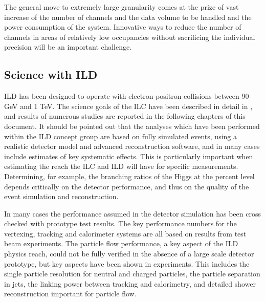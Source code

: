 The general move to extremely large granularity comes at the prize of vast increase of the number of channels and the data volume to be handled and the power consumption of the system. Innovative ways to reduce the number of channels in areas of relatively low occupancies without sacrificing the individual precision will be an important challenge.


\subsection{Science with ILD}
ILD has been designed to operate with electron-positron collisions between 90 GeV and 1 TeV. The science goals of the ILC have been described in detail in \cite{ILCESU1}, 
{and results of numerous studies are reported in the following chapters of this document.}
It should be pointed out that the analyses which have been performed within the ILD concept group are based on fully simulated events, using a realistic detector model and advanced reconstruction software, and in many cases include estimates of key systematic effects. This is particularly important when estimating the reach the ILC and ILD will have for specific measurements. Determining, for example, the branching ratios of the Higgs at the percent level depends critically on the detector performance, and thus on the quality of the event simulation and reconstruction. 

In many cases 
  {the performance assumed in the detector simulation has been cross checked with prototype test results.}
The key performance numbers for the vertexing, tracking and calorimeter systems are all based on results from test beam experiments. The particle flow performance, a key aspect of the ILD physics reach, could  not be fully verified in the absence of   {a large scale detector prototype}, but key aspects have been shown in experiments. This includes the single particle resolution for neutral and charged particles, the particle separation in jets, the linking power between tracking and calorimetry, and
  {detailed shower reconstruction} 
important for particle flow. 

